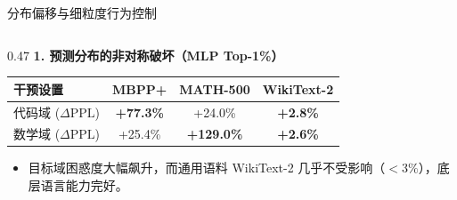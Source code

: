 \documentclass{beamer}
\begin{document}
\begin{frame}{分布偏移与细粒度行为控制}
    \begin{columns}[T]
        \begin{column}{0.47\textwidth}
            \footnotesize
            \textbf{1. 预测分布的非对称破坏（MLP Top-1\%）}
            \vspace{0.1em}
            \begin{center}
            \scriptsize
            \setlength{\tabcolsep}{4pt}
            \begin{tabular}{l|ccc}
                \toprule
                干预设置 & MBPP+ & MATH-500 & WikiText-2 \\
                \midrule
                代码域 ($\Delta\text{PPL}$) & \alert{\textbf{+77.3\%}} & +24.0\% & \textbf{+2.8\%} \\
                数学域 ($\Delta\text{PPL}$) & +25.4\% & \alert{\textbf{+129.0\%}} & \textbf{+2.6\%} \\
                \bottomrule
            \end{tabular}
            \end{center}
            \vspace{-0.2em}
            \begin{itemize}\scriptsize
                \item 目标域困惑度大幅飙升，而通用语料 WikiText-2 几乎不受影响（$<3\%$），底层语言能力完好。
            \end{itemize}


\end{column}
\end{columns}
\end{frame}
\end{document}
